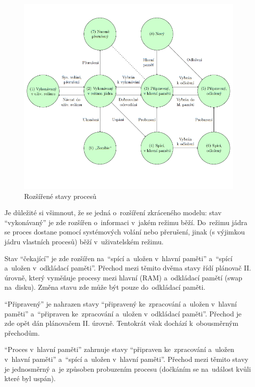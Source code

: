 \begin{figure}[ht]
	\centering
	\includegraphics[width=\textwidth]{images/proc_extended_states.png}
	\caption{Rozšířené stavy procesů}
	\label{proc_extended_states}
\end{figure}

Je důležité si všimnout, že se jedná o~rozšíření zkráceného modelu: stav \enquote{vykonávaný} je zde rozšířen o~informaci v~jakém režimu běží. Do~režimu jádra se proces dostane pomocí systémových volání nebo přerušení, jinak (s výjimkou jádru vlastních procesů) běží v~uživatelském režimu.

Stav \enquote{čekající} je zde rozšířen na~\enquote{spící a~uložen v~hlavní paměti} a~\enquote{spící a~uložen v~odkládací paměti}. Přechod mezi těmito dvěma stavy řídí plánovač II. úrovně, který vyměňuje procesy mezi hlavní (RAM) a~odkládací pamětí (swap na~disku). Změna stavu zde může být pouze do~odkládací paměti.

\enquote{Připravený} je nahrazen stavy \enquote{připravený ke~zpracování a~uložen v~hlavní paměti} a~\enquote{připraven ke~zpracování a~uložen v~odkládací paměti}. Přechod je zde opět dán plánovačem II. úrovně. Tentokrát však dochází k~obousměrným přechodům. 

\enquote{Proces v~hlavní paměti} zahrnuje stavy \enquote{připraven ke~zpracování a~uložen v~hlavní paměti} a~\enquote{spící a~uložen v~hlavní paměti}. Přechod mezi těmito stavy je jednosměrný a~je způsoben probuzením procesu (dočkáním se na~událost kvůli které byl uspán).

